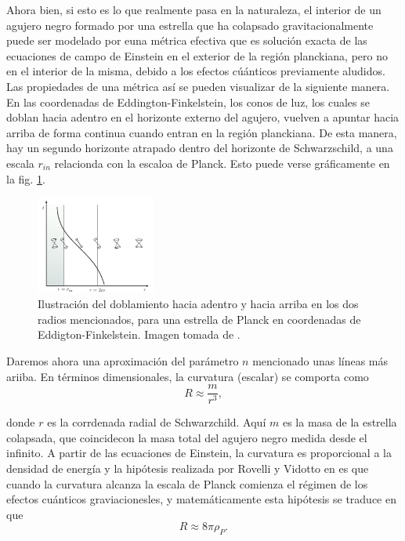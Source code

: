 \documentclass{article}
\numberwithin{equation}{section}
\theoremstyle{definition}
\begin{document}
Ahora bien, si esto es lo que realmente pasa en la naturaleza, el interior de un agujero negro formado por una estrella que ha colapsado gravitacionalmente puede ser modelado por euna métrica efectiva que es solución exacta de las ecuaciones de campo de Einstein en el exterior de la región planckiana, pero no en el interior de la misma, debido a los efectos cúánticos previamente aludidos. Las propiedades de una métrica así se pueden visualizar de la siguiente manera. En las coordenadas de Eddington-Finkelstein, los conos de luz, los cuales se doblan hacia adentro en el horizonte externo del agujero, vuelven a apuntar hacia arriba de forma continua cuando entran en la región planckiana. De esta manera, hay un segundo horizonte atrapado dentro del horizonte de Schwarzschild, a una escala $r_{in}$ relacionda con la escaloa de Planck. Esto puede verse gráficamente en la fig. \ref{fig: light cones}.
\begin{figure}[h!]
	\centering
	\includegraphics[width=0.35\textwidth]{lightcones}
	\caption{Ilustración del doblamiento hacia adentro y hacia arriba en los dos radios mencionados, para una estrella de Planck en coordenadas de Eddigton-Finkelstein. Imagen tomada de \cite{rovelli}.}
	\label{fig: light cones}
\end{figure}

Daremos ahora una aproximación del parámetro $n$ mencionado unas líneas más ariiba. En términos dimensionales, la curvatura (escalar) se comporta como
\begin{equation}
\label{curvature1}
R \approx \frac{m}{r^3},
\end{equation}

donde $r$ es la corrdenada radial de Schwarzchild. Aquí $m$ es la masa de la estrella colapsada, que coincidecon la masa total del agujero negro medida desde el infinito. A partir de las ecuaciones de Einstein, la curvatura es proporcional a la densidad de energía y la hipótesis realizada por Rovelli y Vidotto en \cite{rovelli} es que cuando la curvatura alcanza la escala de Planck comienza el régimen de los efectos cuánticos graviacionesles, y matemáticamente esta hipótesis se traduce en que
\begin{equation}
\label{curvature2}
R \approx 8\pi\rho_P.
\end{equation}
\end{document}
